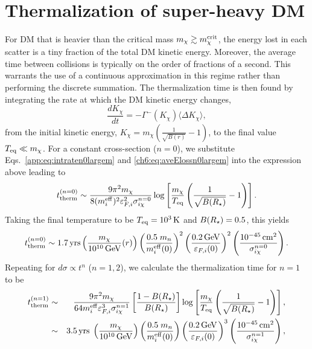 \section{Thermalization of super-heavy DM}
\label{app:sec:thermsuperheavy}



For DM that is heavier than the critical mass  $m_\chi\gtrsim m_\chi^{\rm crit}$,
the energy lost in each scatter is a tiny fraction of the total DM kinetic energy. Moreover, the average time between collisions is typically on the order of fractions of a second. This warrants the use of a continuous approximation in this regime rather than performing the discrete summation. The thermalization time is then found by integrating the rate at which the DM kinetic energy changes, 
\begin{equation}
    \frac{dK_\chi}{dt} = -\Gamma^{-}(K_\chi) \langle\Delta K_\chi\rangle,  
    \label{app:eq:contttherm}
\end{equation}
from the initial kinetic energy, $K_\chi=m_\chi\left(\frac{1}{\sqrt{B(r)}}-1\right)$, to the final value $T_{\rm eq}\ll m_\chi$. For a constant cross-section ($n=0$), we substitute  Eqs.~\ref{app:eq:intraten0largem} and \ref{ch6:eq:aveElossn0largem} into the expression above leading to
\begin{equation}
    t_{\rm therm}^{(n=0)} \sim \frac{9 \pi^2 m_\chi}{8 (m_i^{\rm eff})^2 \varepsilon_{F,i}^2 \sigma_{i\chi}^{n=0}}\log\left[\frac{m_\chi}{T_{\rm eq}}\left(\frac{1}{\sqrt{B(R_\star)}}-1\right)\right].
    \label{app:eq:tthemheavy0}
\end{equation}
Taking the final temperature to be $T_{\rm eq}=10^3{\rm \,K}$ and $B(R_\star)=0.5$, this yields 
\begin{equation}
    t_{\rm therm}^{(n=0)} \sim 1.7  {\rm \,yrs} \left(\frac{m_\chi }{10^{10}{\rm \,GeV}}(r)\right)\left(\frac{0.5\;m_n}{m_i^{\rm eff}(0)}\right)^{2}\left(\frac{0.2{\rm \,GeV}}{\varepsilon_{F,i}(0)}\right)^{2}\left(\frac{10^{-45}{\rm \,cm}^2}{\sigma_{i\chi}^{n=0}}\right).    
\end{equation}
%
Repeating for $d\sigma\propto t^n$ ($n=1,2$), we calculate the thermalization time for $n=1$ to be
\begin{eqnarray}
    t_{\rm therm}^{(n=1)} &\sim& \frac{9\pi^2 m_\chi}{ 64 m_i^{\rm eff} \varepsilon_{F,i}^3 \sigma_{i\chi}^{n=1}}\left[\frac{1-B(R_\star)}{B(R_\star)}\right] \log\left[\frac{m_\chi}{T_{\rm eq}} \left(\frac{1}{\sqrt{B(R_\star)}}-1\right)\right],\\
    &\sim& 3.5 {\rm \,yrs}\; \left(\frac{m_\chi}{10^{10} {\rm \,GeV}}\right)\left(\frac{0.5\;m_n}{m_i^{\rm eff}(0)}\right) \left(\frac{0.2{\rm \,GeV}}{\varepsilon_{F,i}(0)}\right)^{3}\left(\frac{10^{-45}{\rm \,cm}^2}{\sigma_{i\chi}^{n=1}}\right),
\end{eqnarray}

